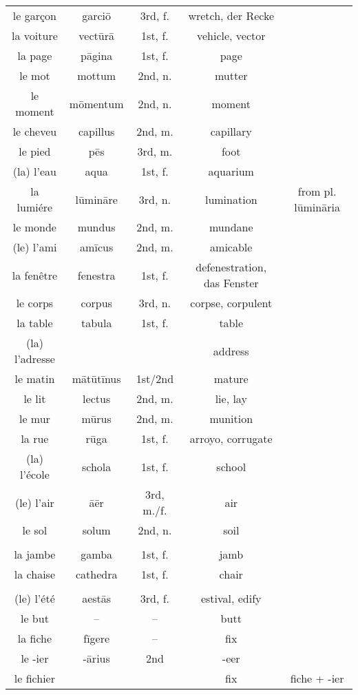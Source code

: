 \documentclass{article}
\begin{document}
\begin{longtable}{ccccc}
    le gar\c{c}on & garci\=o & 3rd, f. & wretch, der Recke \\
    la voiture & vect\=ur\=a & 1st, f. & vehicle, vector \\
    la page & p\=agina & 1st, f. & page \\
    le mot & mottum & 2nd, n. & mutter \\
    le moment & m\=omentum & 2nd, n. & moment \\
    le cheveu & capillus & 2nd, m. & capillary \\
    le pied & p\=es & 3rd, m. & foot \\
    (la) l'eau & aqua & 1st, f. & aquarium \\
    la lumi\'ere & l\=umin\=are & 3rd, n. & lumination & from pl. l\=umin\=aria \\
    le monde & mundus & 2nd, m. & mundane \\
    (le) l'ami & am\=icus & 2nd, m. & amicable \\
    la fen\^etre & fenestra & 1st, f. & defenestration, das Fenster \\
    le corps & corpus & 3rd, n. & corpse, corpulent \\
    la table & tabula & 1st, f. & table \\
    \color{red}(la) l'adresse &  &  & address \\
    le matin & m\=at\=ut\=inus & 1st/2nd & mature \\
    le lit & lectus & 2nd, m. & lie, lay \\
    le mur & m\=urus & 2nd, m. & munition \\
    la rue & r\=uga & 1st, f. & arroyo, corrugate \\
    (la) l'\'ecole & schola & 1st, f. & school \\
    (le) l'air & \=a\=er & 3rd, m./f. & air \\
    le sol & solum & 2nd, n. & soil \\
    \\
    la jambe & gamba & 1st, f. & jamb \\
    la chaise & cathedra & 1st, f. & chair \\
    \\
    (le) l'\'et\'e & aest\=as & 3rd, f. & estival, edify \\
    le but & -- & -- & butt \\
    la fiche & f\=igere & -- & fix \\
    le -ier & -\=arius & 2nd & -eer \\
    le fichier & & & fix & fiche + -ier \\

\end{longtable}
\end{document}
